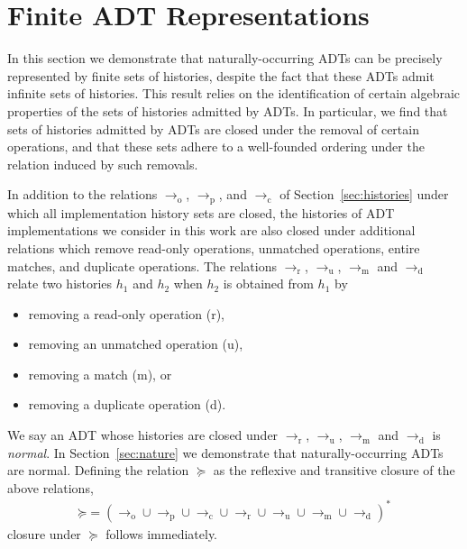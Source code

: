 \section{Finite ADT Representations}
\label{sec:patterns}

In this section we demonstrate that naturally-occurring ADTs can be precisely
represented by finite sets of histories, despite the fact that these ADTs admit
infinite sets of histories. This result relies on the identification of certain
algebraic properties of the sets of histories admitted by ADTs. In particular,
we find that sets of histories admitted by ADTs are closed under the removal
of certain operations, and that these sets adhere to a well-founded ordering
under the relation induced by such removals.

In addition to the relations $\to_\mathrm{o}$, $\to_\mathrm{p}$, and
$\to_\mathrm{c}$ of Section~\ref{sec:histories} under which all implementation
history sets are closed, the histories of ADT implementations we consider in
this work are also closed under additional relations which remove read-only
operations, unmatched operations, entire matches, and duplicate operations. The
relations $\to_\mathrm{r}$, $\to_\mathrm{u}$, $\to_\mathrm{m}$ and
$\to_\mathrm{d}$ relate two histories $h_1$ and $h_2$ when $h_2$ is obtained
from $h_1$ by
\begin{itemize}

  \item removing a read-only operation (r),

  \item removing an unmatched operation (u),

  \item removing a match (m), or

  \item removing a duplicate operation (d).

\end{itemize}
We say an ADT whose histories are closed under $\to_\mathrm{r}$,
$\to_\mathrm{u}$, $\to_\mathrm{m}$ and $\to_\mathrm{d}$ is \emph{normal}. In
Section~\ref{sec:nature} we demonstrate that naturally-occurring ADTs are
normal. Defining the relation $\succeq$ as the reflexive and transitive closure
of the above relations,
\begin{align*}
  \mathord{\succeq} = (
    \to_\mathrm{o} \cup \to_\mathrm{p} \cup \to_\mathrm{c} \cup
    \to_\mathrm{r} \cup \to_\mathrm{u} \cup \to_\mathrm{m} \cup \to_\mathrm{d}
  )^\ast
\end{align*}
closure under $\succeq$ follows immediately.

